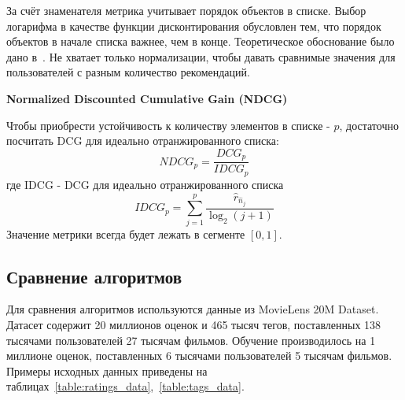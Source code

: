 За счёт знаменателя метрика учитывает порядок объектов в списке.
Выбор логарифма в качестве функции дисконтирования обусловлен тем, что порядок объектов в начале списка важнее, чем в конце.
Теоретическое обоснование было дано в~\cite{dcg-log}.
Не хватает только нормализации, чтобы давать сравнимые значения для пользователей с разным количество рекомендаций.

\vspace{1em}
\textbf{Normalized Discounted Cumulative Gain (NDCG)}

Чтобы приобрести устойчивость к количеству элементов в списке - $p$, достаточно посчитать DCG для идеально отранжированного списка:
\begin{equation}\label{eq:ndcg}
NDCG_p = \frac{DCG_p}{IDCG_p}
\end{equation}
где IDCG - DCG для идеально отранжированного списка
\begin{equation}\label{eq:idcg}
IDCG_p = \sum_{j=1}^{p}\frac{\hat{r}_{\hat{n}_j}}{\log_2 (j + 1)}
\end{equation}
Значение метрики всегда будет лежать в сегменте $[0,1]$.


\pagebreak
\subsection{Сравнение алгоритмов}\label{subsec:algos_comparison}
Для сравнения алгоритмов используются данные из MovieLens 20M Dataset.
Датасет содержит 20 миллионов оценок и 465 тысяч тегов, поставленных 138 тысячами пользователей 27 тысячам фильмов.
Обучение производилось на 1 миллионе оценок, поставленных 6 тысячами пользователей 5 тысячам фильмов.
Примеры исходных данных приведены на таблицах~\ref{table:ratings_data},~\ref{table:tags_data}.

